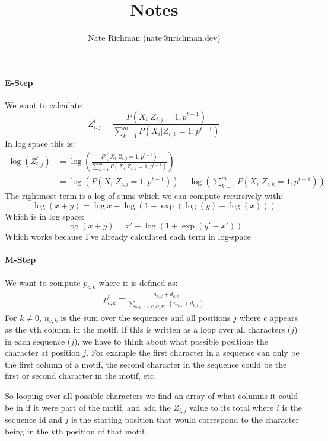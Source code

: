 \documentclass[10pt,a4paper]{article}
\begin{document}
\title{Notes}
\author{Nate Richman (nate@nrichman.dev)}
\maketitle

\paragraph{E-Step}
We want to calculate:
\[
    Z_{i,j}^t = \frac{P(X_i|Z_{i,j}=1,p^{t-1})}{\sum_{k=1}^{m}P(X_i|Z_{i,k}=1,p^{t-1})}
\] 
In log space this is:
\begin{align*}
    \log (Z_{i,j}^t) &=\log \left( \frac{P(X_i|Z_{i,j}=1,p^{t-1})}{\sum_{k=1}^{m}P(X_i|Z_{i,k}=1,p^{t-1})}\right)\\
                     &= \log \left( P(X_i|Z_{i,j}=1,p^{t-1}) \right) - \log \left( \sum_{k=1}^{m}P(X_i|Z_{i,k}=1,p^{t-1}) \right)
\end{align*}
The rightmost term is a log of sums which we can compute recursively with:
\[
    \log(x + y) = \log x + \log \left(1 + \exp (\log(y) - \log(x))\right) 
\] 
Which is in log space:
\[
    \log(x + y) = x' + \log(1 + \exp(y' - x'))
\] 
Which works because I've already calculated each term in log-space
\paragraph{M-Step}
We want to compute $p_{c,k}$ where it is defined as:
\begin{align*}
    p_{c,k}^t = \frac{n_{c,k} + d_{c,k}}{\displaystyle\sum\limits_{b \in \left\{A,C,G,T\right\}} \left( n_{b,k} + d_{b,k} \right)}
\end{align*}
For $k \ne 0$, $n_{c,k}$ is the sum over the sequences and all positions $j$ where $c$ appears as the $k$th column in the motif.  If this is written as a loop over all characters ($j$) in each sequence ($j$), we have to think about what possible positions the character at position $j$.  For example the first character in a sequence can only be the first column of a motif, the second character in the sequence could be the first or second character in the motif, etc.

So looping over all possible characters we find an array of what columns it could be in if it were part of the motif, and add the $Z_{i,j}$ value to its total where $i$ is the sequence id and $j$ is the starting position that would correspond to the character being in the $k$th position of that motif.
\end{document}
